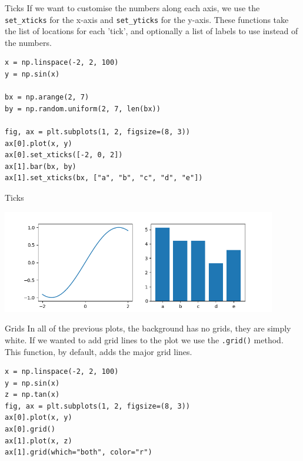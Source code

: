 \documentclass[10pt]{beamer}
\begin{document}
\begin{frame}[label={sec:org4843eda},fragile]{Ticks}
 If we want to customise the numbers along each axis, we use the \texttt{set\_xticks} for
the x-axis and \texttt{set\_yticks} for the y-axis. These functions take the list of
locations for each 'tick', and optionally a list of labels to use instead of the numbers.

\begin{verbatim}
x = np.linspace(-2, 2, 100)
y = np.sin(x)

bx = np.arange(2, 7)
by = np.random.uniform(2, 7, len(bx))

fig, ax = plt.subplots(1, 2, figsize=(8, 3))
ax[0].plot(x, y)
ax[0].set_xticks([-2, 0, 2])
ax[1].bar(bx, by)
ax[1].set_xticks(bx, ["a", "b", "c", "d", "e"])
\end{verbatim}
\end{frame}

\begin{frame}[label={sec:org9bdf587}]{Ticks}
\begin{center}
\includegraphics[width=0.9\textwidth]{images/ticks.png}
\end{center}
\end{frame}

\begin{frame}[label={sec:orgef51df6},fragile]{Grids}
 In all of the previous plots, the background has no grids, they are simply
white. If we wanted to add grid lines to the plot we use the \texttt{.grid()}
method. This function, by default, adds the major grid lines.

\begin{verbatim}
x = np.linspace(-2, 2, 100)
y = np.sin(x)
z = np.tan(x)
fig, ax = plt.subplots(1, 2, figsize=(8, 3))
ax[0].plot(x, y)
ax[0].grid()
ax[1].plot(x, z)
ax[1].grid(which="both", color="r")
\end{verbatim}
\end{frame}
\end{document}
